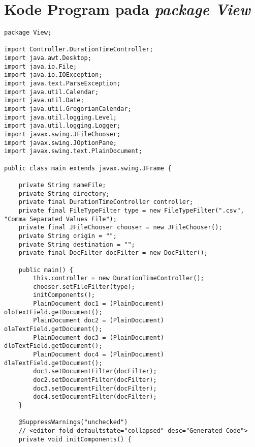 \chapter{Kode Program pada \textit{package View}}
\label{chap:kodeprogramC}

\begin{lstlisting}[caption= main.java]
package View;

import Controller.DurationTimeController;
import java.awt.Desktop;
import java.io.File;
import java.io.IOException;
import java.text.ParseException;
import java.util.Calendar;
import java.util.Date;
import java.util.GregorianCalendar;
import java.util.logging.Level;
import java.util.logging.Logger;
import javax.swing.JFileChooser;
import javax.swing.JOptionPane;
import javax.swing.text.PlainDocument;

public class main extends javax.swing.JFrame {

    private String nameFile;
    private String directory;
    private final DurationTimeController controller;
    private final FileTypeFilter type = new FileTypeFilter(".csv", "Comma Separated Values File");
    private final JFileChooser chooser = new JFileChooser();
    private String origin = "";
    private String destination = "";
    private final DocFilter docFilter = new DocFilter();

    public main() {
        this.controller = new DurationTimeController();
        chooser.setFileFilter(type);
        initComponents();
        PlainDocument doc1 = (PlainDocument) oloTextField.getDocument();
        PlainDocument doc2 = (PlainDocument) olaTextField.getDocument();
        PlainDocument doc3 = (PlainDocument) dloTextField.getDocument();
        PlainDocument doc4 = (PlainDocument) dlaTextField.getDocument();
        doc1.setDocumentFilter(docFilter);
        doc2.setDocumentFilter(docFilter);
        doc3.setDocumentFilter(docFilter);
        doc4.setDocumentFilter(docFilter);
    }
    
    @SuppressWarnings("unchecked")
    // <editor-fold defaultstate="collapsed" desc="Generated Code">                          
    private void initComponents() {


\end{lstlisting}
